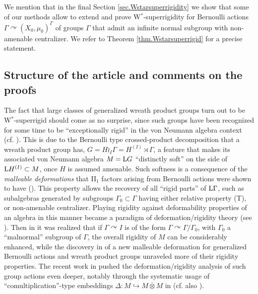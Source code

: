 \documentclass[a4paper,11pt]{amsart}
\numberwithin{equation}{section}
\begin{document}
We mention that in the final Section \ref{sec.Wstarsuperrigidity} we
show that some of our methods allow to extend \cite[Theorem A]{Io10}
and prove W$^*$-superrigidity for Bernoulli actions $\Gamma {\curvearrowright}
(X_0,\mu_0)^\Gamma$ of groups $\Gamma$ that admit an infinite normal
subgroup with non-amenable centralizer. We refer to Theorem
\ref{thm.Wstarsuperrigid} for a precise statement.

\subsection*{Structure of the article and comments on the proofs}

The fact that large classes of generalized wreath product groups
turn out to be W$^*$-superrigid should come as no surprise, since
such groups have been recognized for some time to be ``exceptionally
rigid'' in the von Neumann algebra context (cf.
\cite{Po01a,Po03,Po04,Po06a,PV06,PV09,Io06,CI08,Io10}). This is due
to the Bernoulli type crossed-product decomposition that a wreath
product group has, $G=H\wr_I \Gamma=H^{(I)}\rtimes \Gamma$, a
feature that makes its associated von Neumann algebra $M={\mathord{\text{\rm L}}} G$
``distinctly soft'' on the side of ${\mathord{\text{\rm L}}} H^{(I)}\subset M$, once $H$
is assumed amenable. Such softness is a consequence of the {\it
malleable deformations} that II$_1$ factors arising from Bernoulli
actions were shown to have (\cite{Po01a,Po03}). This property allows
the recovery of all ``rigid parts'' of ${\mathord{\text{\rm L}}} \Gamma$, such as
subalgebras generated by subgroups $\Gamma_0\subset \Gamma$ having
either relative property (T), or non-amenable centralizer. Playing
rigidity against deformability properties of an algebra in this
manner became a paradigm of deformation/rigidity theory (see
\cite{Po01a,Po03,Po04,Po06a,Po06b}). Then in \cite{PV06} it was
realized that if $\Gamma \curvearrowright I$ is of the form $\Gamma
\curvearrowright \Gamma/\Gamma_0$, with $\Gamma_0$ a ``malnormal''
subgroup of $\Gamma$, the overall rigidity of $M$ can be
considerably enhanced, while the discovery in \cite{Io06} of a new
malleable deformation for generalized Bernoulli actions and wreath
product groups unraveled more of their rigidity properties. The
recent work in \cite{PV09,Io10} pushed the deformation/rigidity
analysis of such group actions even deeper, notably through the
systematic usage of ``comultiplication''-type embeddings $\Delta:M
\hookrightarrow M\overline{\otimes} M$ in \cite{Io10} (cf. also
\cite{PV09}).
\end{document}
